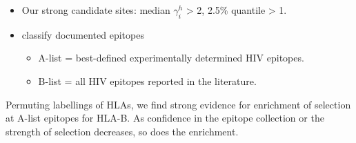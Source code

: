 \documentclass[portrait,final,a0paper,fontscale=0.277]{baposter}
\begin{document}
\begin{poster}
{\vspace{0.6em}
\vspace{-2mm}
\begin{itemize}
\item Our strong candidate sites: median $\gamma_i^h$ > 2, 2.5\% quantile > 1.\vspace{-2mm}
\item classify documented epitopes
\begin{itemize}\vspace{-2mm}
\item A-list = best-defined experimentally determined HIV epitopes.\vspace{-1mm}
\item B-list = all HIV epitopes reported in the literature.
\end{itemize}
\end{itemize}
\noindent Permuting labellings of HLAs, we find strong evidence for enrichment of selection at A-list epitopes for HLA-B. As confidence in the epitope collection or the strength of selection decreases, so does the enrichment.  
}
\end{poster}
\end{document}
